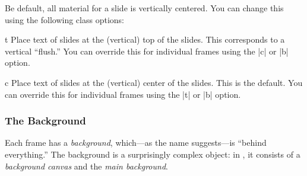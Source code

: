 
Be default, all material for a slide is vertically centered. You can change this using the following class options:

\begin{classoption}{t}
  Place text of slides at the (vertical) top of the slides. This corresponds to a vertical ``flush.'' You can override this for individual frames using the |c| or |b| option.
\end{classoption}

\begin{classoption}{c}
  Place text of slides at the (vertical) center of the slides. This is the default. You can override this for individual frames using the |t| or |b| option.
\end{classoption}

\subsubsection{The Background}
\label{section-canvas}
\label{section-background}

Each frame has a \emph{background}, which---as the name suggests---is ``behind everything.'' The background is a surprisingly complex object: in \beamer, it consists of a \emph{background canvas} and the \emph{main background}.

